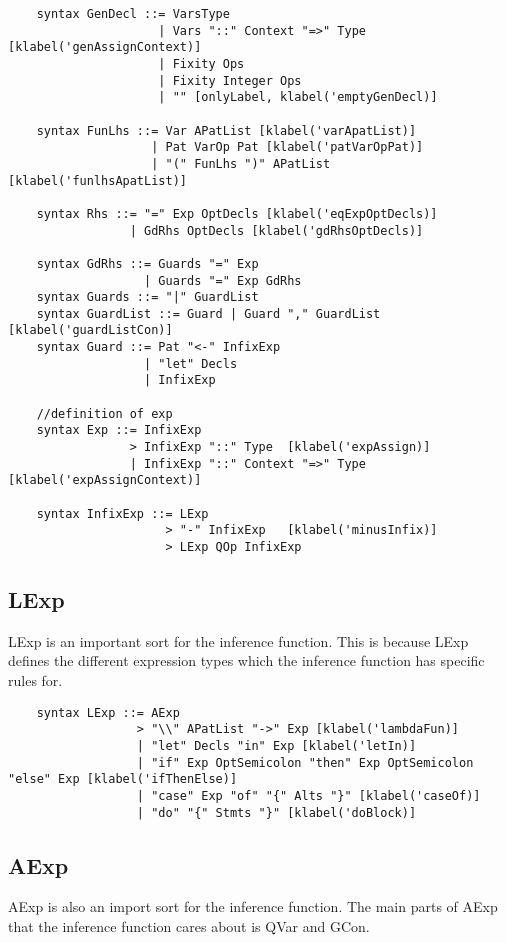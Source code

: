 \begin{lstlisting}
    syntax GenDecl ::= VarsType
                     | Vars "::" Context "=>" Type   [klabel('genAssignContext)]
                     | Fixity Ops
                     | Fixity Integer Ops
                     | "" [onlyLabel, klabel('emptyGenDecl)]

    syntax FunLhs ::= Var APatList [klabel('varApatList)]
                    | Pat VarOp Pat [klabel('patVarOpPat)]
                    | "(" FunLhs ")" APatList [klabel('funlhsApatList)]

    syntax Rhs ::= "=" Exp OptDecls [klabel('eqExpOptDecls)]
                 | GdRhs OptDecls [klabel('gdRhsOptDecls)]

    syntax GdRhs ::= Guards "=" Exp
                   | Guards "=" Exp GdRhs
    syntax Guards ::= "|" GuardList
    syntax GuardList ::= Guard | Guard "," GuardList  [klabel('guardListCon)]
    syntax Guard ::= Pat "<-" InfixExp
                   | "let" Decls
                   | InfixExp

    //definition of exp
    syntax Exp ::= InfixExp
                 > InfixExp "::" Type  [klabel('expAssign)]
                 | InfixExp "::" Context "=>" Type  [klabel('expAssignContext)]

    syntax InfixExp ::= LExp
                      > "-" InfixExp   [klabel('minusInfix)]
                      > LExp QOp InfixExp
\end{lstlisting}

\subsection{LExp}
LExp is an important sort for the inference function. This is because LExp defines the different expression types which the inference function has specific rules for.

\begin{lstlisting}
    syntax LExp ::= AExp
                  > "\\" APatList "->" Exp [klabel('lambdaFun)]
                  | "let" Decls "in" Exp [klabel('letIn)]
                  | "if" Exp OptSemicolon "then" Exp OptSemicolon "else" Exp [klabel('ifThenElse)]
                  | "case" Exp "of" "{" Alts "}" [klabel('caseOf)]
                  | "do" "{" Stmts "}" [klabel('doBlock)]

\end{lstlisting}

\subsection{AExp}
AExp is also an import sort for the inference function. The main parts of AExp that the inference function cares about is QVar and GCon.

